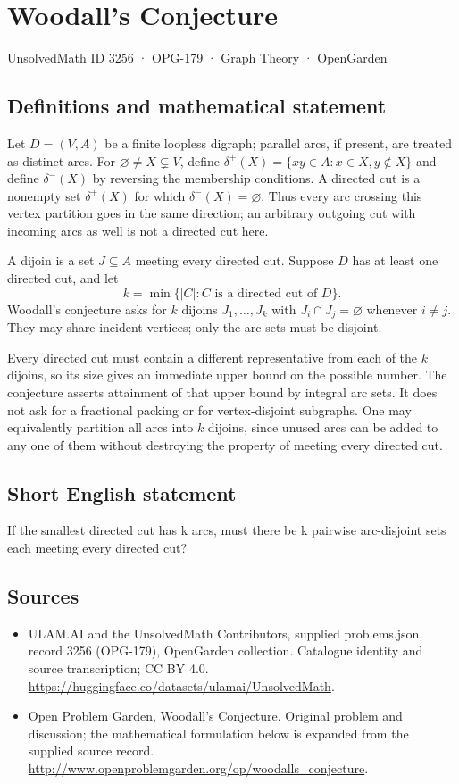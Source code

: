 \documentclass[11pt,a4paper]{article}
\begin{document}
\section*{Woodall's Conjecture}\label{3256}
{\small UnsolvedMath ID 3256 · OPG-179 · Graph Theory · OpenGarden}
\subsection{Definitions and mathematical statement}
Let $D=(V,A)$ be a finite loopless digraph; parallel arcs, if present, are
treated as distinct arcs. For $\varnothing\ne X\subsetneq V$, define
$\delta^+(X)=\{xy\in A:x\in X,y\notin X\}$ and define $\delta^-(X)$
by reversing the membership conditions. A directed cut is a nonempty
set $\delta^+(X)$ for which $\delta^-(X)=\varnothing$. Thus every arc
crossing this vertex partition goes in the same direction; an arbitrary
outgoing cut with incoming arcs as well is not a directed cut here.

A dijoin is a set $J\subseteq A$ meeting every directed cut. Suppose
$D$ has at least one directed cut, and let
\[
             k=\min\{|C|:C\text{ is a directed cut of }D\}.
\]
Woodall's conjecture asks for $k$ dijoins $J_1,\ldots,J_k$ with
$J_i\cap J_j=\varnothing$ whenever $i\ne j$. They may share incident
vertices; only the arc sets must be disjoint.

Every directed cut must contain a different representative from each
of the $k$ dijoins, so its size gives an immediate upper bound on the
possible number. The conjecture asserts attainment of that upper bound
by integral arc sets. It does not ask for a fractional packing or for
vertex-disjoint subgraphs. One may equivalently partition all arcs into
$k$ dijoins, since unused arcs can be added to any one of them without
destroying the property of meeting every directed cut.
\subsection{Short English statement}
If the smallest directed cut has k arcs, must there be k pairwise arc-disjoint sets each meeting every directed cut?
\subsection{Sources}
\begin{itemize}
\item[S1] ULAM.AI and the UnsolvedMath Contributors, supplied problems.json, record 3256 (OPG-179), OpenGarden collection. Catalogue identity and source transcription; CC BY 4.0.
\url{https://huggingface.co/datasets/ulamai/UnsolvedMath}.
\item[S2] Open Problem Garden, Woodall's Conjecture. Original problem and discussion; the mathematical formulation below is expanded from the supplied source record.
\url{http://www.openproblemgarden.org/op/woodalls_conjecture}.
\end{itemize}
\end{document}
